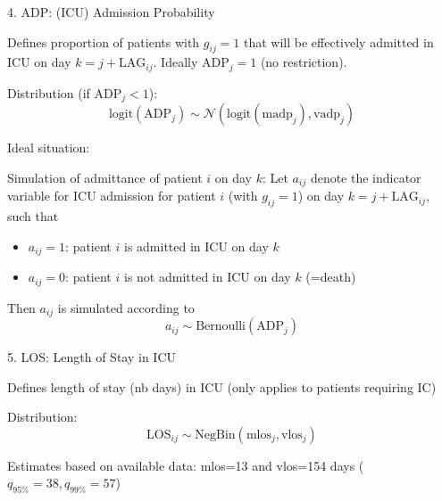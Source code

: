 \documentclass[t,9pt,xcolor=dvipsnames]{beamer}              %
\begin{document}
\begin{frame}{4. ADP: (ICU) Admission Probability}

Defines proportion of patients with $g_{ij}=1$ that will be effectively admitted in ICU on day $k=j+\text{LAG}_{ij}$. Ideally $\text{ADP}_{j}=1$ (no restriction).
\medskip

Distribution (if $\text{ADP}_{j}<1$):
\begin{equation*}
\text{logit}(\text{ADP}_{j}) \sim \mathcal{N}\left(\text{logit}(\text{madp}_{j}), \text{vadp}_{j}\right)
\end{equation*}

Ideal situation: \

Simulation of admittance of patient $i$ on day $k$:
Let $a_{ij}$ denote the indicator variable for ICU admission for patient $i$ (with $g_{ij}=1$) on day $k=j+\text{LAG}_{ij}$, such that
\begin{itemize}
\item $a_{ij}=1$: patient $i$ is admitted in ICU on day $k$
\item $a_{ij}=0$: patient $i$ is not admitted in ICU on day $k$ (=death)
\end{itemize}

Then $a_{ij}$ is simulated according to
\begin{equation*}
a_{ij} \sim \text{Bernoulli}\left(\text{ADP}_{j}\right)
\end{equation*} 

\note{
\tiny
\justifying

}
\end{frame}



\begin{frame}{5. LOS: Length of Stay in ICU}

Defines length of stay (nb days) in ICU (only applies to patients requiring IC)
\medskip

Distribution:
\begin{equation*}
\text{LOS}_{ij} \sim \text{NegBin}\left(\text{mlos}_{j}, \text{vlos}_{j}\right)
\end{equation*}

Estimates based on available data: mlos=13 and vlos=154 days ($q_{95\%}=38, q_{99\%}=57$)

\note{
\tiny
\justifying

}
\end{frame}
\end{document}
